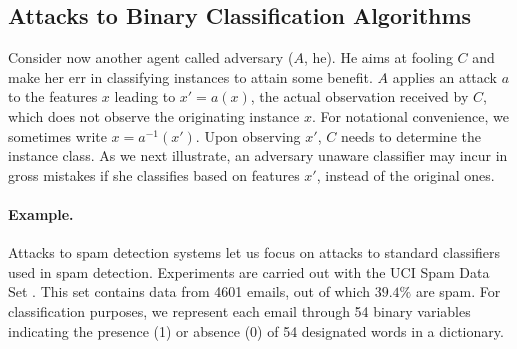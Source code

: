  

\subsection{Attacks to Binary Classification Algorithms} \label{sec:att_class}

Consider now another agent called adversary ($A$, he).
He aims at fooling $C$ and make her err in classifying instances to attain some benefit. 
$A$ applies an attack $a$ to the features $x$ leading to $x'=a(x)$, the actual observation received by $C$, which does 
not observe the originating instance $x$.
For notational convenience, we sometimes write $x=a^{-1} (x')$.
Upon observing $x'$, $C$ needs to determine the instance  class. 
As we next illustrate, an adversary unaware classifier
may incur in gross mistakes if she classifies based on features $x'$, instead of the original ones.

\paragraph{Example.} Attacks to spam detection systems let us focus on attacks to standard classifiers used in spam detection. Experiments are carried out with the UCI Spam Data Set \cite{spambase1999}.
This set contains data from 4601 emails, out of which $39.4 \%$ are spam. For classification purposes, we represent each email through 54 binary variables indicating the presence (1) or absence (0) of 54 designated words in a dictionary.


